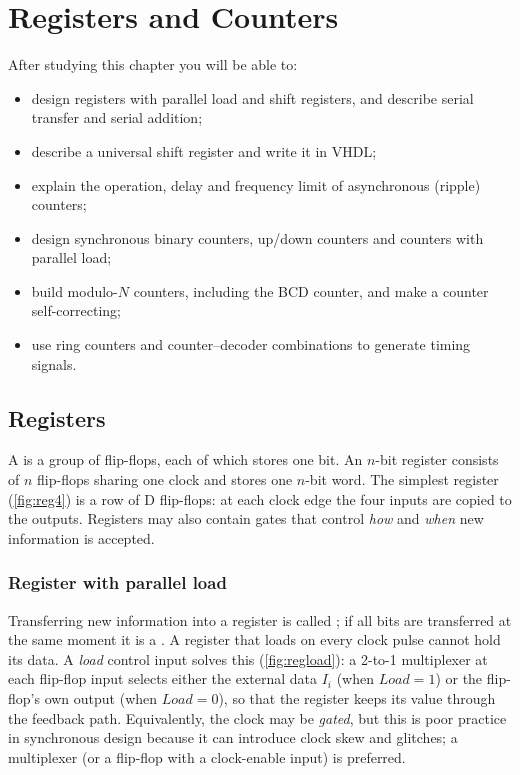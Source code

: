\chapter{Registers and Counters}\label{ch:registers}

\begin{objectives}
After studying this chapter you will be able to:
\begin{itemize}
  \item design registers with parallel load and shift registers, and describe serial transfer and serial addition;
  \item describe a universal shift register and write it in VHDL;
  \item explain the operation, delay and frequency limit of asynchronous (ripple) counters;
  \item design synchronous binary counters, up/down counters and counters with parallel load;
  \item build modulo-$N$ counters, including the BCD counter, and make a counter self-correcting;
  \item use ring counters and counter--decoder combinations to generate timing signals.
\end{itemize}
\end{objectives}

\section{Registers}\label{sec:registers}
A  is a group of flip-flops, each of which stores one bit. An $n$-bit register consists of $n$ flip-flops sharing one clock and stores one $n$-bit word. The simplest register (\cref{fig:reg4}) is a row of D flip-flops: at each clock edge the four inputs are copied to the outputs. Registers may also contain gates that control \emph{how} and \emph{when} new information is accepted.


\subsection{Register with parallel load}
Transferring new information into a register is called ; if all bits are transferred at the same moment it is a . A register that loads on every clock pulse cannot hold its data. A \emph{load} control input solves this (\cref{fig:regload}): a 2-to-1 multiplexer at each flip-flop input selects either the external data $I_i$ (when $\mathit{Load}=1$) or the flip-flop's own output (when $\mathit{Load}=0$), so that the register keeps its value through the feedback path. Equivalently, the clock may be \emph{gated}, but this is poor practice in synchronous design because it can introduce clock skew and glitches; a multiplexer (or a flip-flop with a clock-enable input) is preferred.

